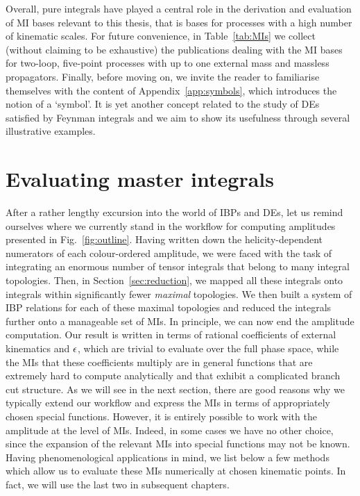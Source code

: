 \documentclass[main.tex]{subfiles}
\begin{document}
Overall, pure integrals have played a central role in the derivation and evaluation of MI bases relevant to this thesis, that is bases for processes with a high number of kinematic scales. For future convenience, in Table~\ref{tab:MIs} we collect (without claiming to be exhaustive) the publications dealing with the MI bases for two-loop, five-point processes with up to one external mass and massless propagators. Finally, before moving on, we invite the reader to familiarise themselves with the content of Appendix~\ref{app:symbols}, which introduces the notion of a `symbol'. It is yet another concept related to the study of DEs satisfied by Feynman integrals and we aim to show its usefulness through several illustrative examples.

\section{Evaluating master integrals}
After a rather lengthy excursion into the world of IBPs and DEs, let us remind ourselves where we currently stand in the workflow for computing amplitudes presented in Fig.~\ref{fig:outline}. Having written down the helicity-dependent numerators of each colour-ordered amplitude, we were faced with the task of integrating an enormous number of tensor integrals that belong to many integral topologies. Then, in Section~\ref{sec:reduction}, we mapped all these integrals onto integrals within significantly fewer \textit{maximal} topologies. We then built a system of IBP relations for each of these maximal topologies and reduced the integrals further onto a manageable set of MIs. In principle, we can now end the amplitude computation. Our result is written in terms of rational coefficients of external kinematics and $\epsilon$, which are trivial to evaluate over the full phase space, while the MIs that these coefficients multiply are in general functions that are extremely hard to compute analytically and that exhibit a complicated branch cut structure. As we will see in the next section, there are good reasons why we typically extend our workflow and express the MIs in terms of appropriately chosen special functions. However, it is entirely possible to work with the amplitude at the level of MIs. Indeed, in some cases we have no other choice, since the expansion of the relevant MIs into special functions may not be known. Having phenomenological applications in mind, we list below a few methods which allow us to evaluate these MIs numerically at chosen kinematic points. In fact, we will use the last two in subsequent chapters.
\end{document}
